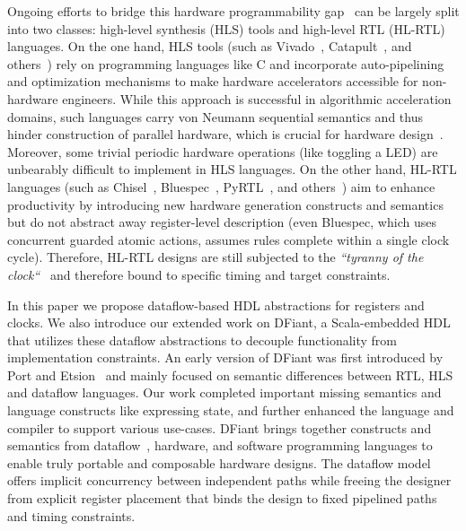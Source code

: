 Ongoing efforts to bridge this hardware programmability gap~\cite{Kapre2016, Nane2016, Windh2015, Lahti2019} can be largely split into two classes: high-level synthesis (HLS) tools and high-level RTL (HL-RTL) languages.
On the one hand, HLS tools (such as Vivado~\cite{Vivado2012}, Catapult~\cite{graphics2008catapult}, and others~\cite{Kavvadias2013, synphony2015}) rely on programming languages like C and incorporate auto-pipelining and optimization mechanisms to make hardware accelerators accessible for non-hardware engineers. While this approach is successful in algorithmic acceleration domains, such languages carry von Neumann sequential semantics and thus hinder construction of parallel hardware, which is crucial for hardware design~\cite{Zhao2017}. Moreover, some trivial periodic hardware operations (like toggling a LED) are unbearably difficult to implement in HLS languages.
On the other hand, HL-RTL languages (such as Chisel~\cite{Bachrach2012}, Bluespec~\cite{nikhil2004bluespec}, PyRTL~\cite{Clow2017}, and others~\cite{Charles2016, Liu2017, jiang2018mamba, decaluwe2004myhdl, CxLang2014, Lockhart2014}) aim to enhance productivity by introducing new hardware generation constructs and semantics but do not abstract away register-level description (even Bluespec, which uses concurrent guarded atomic actions, assumes rules complete within a single clock cycle). Therefore, HL-RTL designs are still subjected to the \emph{``tyranny of the clock``}~\cite{Sutherland2012} and therefore bound to specific timing and target constraints.

In this paper we propose dataflow-based HDL abstractions for registers and clocks. We also introduce our extended work on DFiant, a Scala-embedded HDL that utilizes these dataflow abstractions to decouple functionality from implementation constraints. An early version of DFiant was first introduced by Port and Etsion~\cite{Port2017} and mainly focused on semantic differences between RTL, HLS and dataflow languages. Our work completed important missing semantics and language constructs like expressing state, and further enhanced the language and compiler to support various use-cases. DFiant brings together constructs and semantics from dataflow~\cite{le1986signal, Thuau1991, gurd1985manchester, arvind1992id}, hardware, and software programming languages to enable truly portable and composable hardware designs. The dataflow model offers implicit concurrency between independent paths while freeing the designer from explicit register placement that binds the design to fixed pipelined paths and timing constraints.

